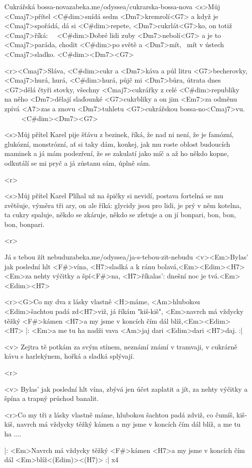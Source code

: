 \begin{song}{69}{Cukrářská bossa-nova}{zabeka.me/odyssea/cukrarska-bossa-nova}
	<s>Můj <Cmaj7>přítel <C#dim>snídá sedm <Dm7>kremrolí<G7>
	a když je <Cmaj7>spořádá, dá si <C#dim>repete,
	<Dm7>cukrlát<G7>ko,
	on totiž <Cmaj7>říká: \ \ <C#dim>Dobré lidi zuby <Dm7>nebolí<G7>
	a je to <Cmaj7>paráda, chodit <C#dim>po světě
	a <Dm7>mít, \ <G7>mít v ústech <Cmaj7>sladko. <C#dim><Dm7><G7>

	<r><Cmaj7>Sláva, <C#dim>cukr a <Dm7>káva a půl litru <G7>becherovky,
	<Cmaj7>hurá, hurá, <C#dim>hurá, půjč mi <Dm7>bůra, útrata dnes <G7>dělá čtyři stovky,
	všechny <Cmaj7>cukrářky z celé <C#dim>republiky
	na něho <Dm7>dělají slaďounké <G7>cukrbliky
	a on jim <Em7>za odměnu zpívá <A7>zas a znovu
	<Dm7>tuhletu <G7>cukrářskou bossa-no<Cmaj7>vu. \ \ \ \ \ <C#dim><Dm7><G7>

	<s>Můj přítel Karel pije šťávu z bezinek,
	říká, že nad ni není,
	že je famózní, glukózní, monstrózní, ať si taky dám,
	koukej, jak mu roste oblost budoucích maminek
	a já mám podezření,
	že se zakulatí jako míč
	a až ho někdo kopne, odkutálí se mi pryč
	a já zůstanu sám, úplně sám.

	<r>

	<s>Můj přítel Karel Plíhal už na špičky si nevidí,
	postava fortelná se mu zvětšuje,
	výměra tři ary,
	on ale říká: glycidy jsou pro lidi,
	je prý v něm kotelna, ta cukry spaluje,
	někdo se zkáruje, někdo se zfetuje
	a on jí bonpari, bon, bon, bon, bonpari.

	<r>
\end{song}
\begin{song}[Nerez]{70}{Já s tebou žít nebudu}{zabeka.me/odyssea/ja-s-tebou-zit-nebudu}
	<v><Em>Bylas' jak poslední hlt <F#>vína,
	<H7>sladká a k ránu bolavá,<Em><Edim><H7>
	<Em>za nehty výčitky a špí<F#>na,
	<H7>říkalas': dnešní noc je tvá.<Em><Edim><H7>

	<r><G>Co my dva z lásky vlastně <H>máme,
	<Am>hlubokou <Edim>šachtou padá zd<H7>viž, já říkám "kiš-kiš",
	<Em>navrch má vždycky těžký <F#>kámen
	<H7>a my jsme v koncích čím dál blíž,<Em><Edim><H7>
	|: <Em>a me tu ha nadži vava <Am>jaj dari <Edim>dari <H7>daj. :|

	<v> Zejtra tě potkám za svým stínem,
	neznámí známí v tramvaji,
	v cukrárně kávu s harlekýnem,
	hořká a sladká splývají.

	<r>

	<v> Bylas' jak poslední hlt vína,
	zbývá jen účet zaplatit a jít,
	za nehty výčitky a špína
	a trapný průchod banalit.

	<r>Co my tři z lásky vlastně máme,
	hlubokou šachtou padá zdviž, co čumíš, kiš-kiš,
	navrch má vždycky těžký kámen
	a my jsme v koncích čím dál blíž,
	a me tu ha ....

	|: <Em>Navrch má vždycky těžký <F#>kámen
	<H7>a my jsme v koncích čím dál <Em>blíž<(Edim)><(H7)> :| x4

\end{song}


